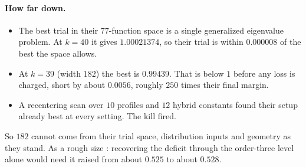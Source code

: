 \paragraph{How far down.} 
\begin{itemize}
\item The best trial in their $77$-function space is a single generalized eigenvalue problem. At $k=40$ it gives $1.00021374$, so their trial is within $0.000008$ of the best the space allows.
\item At $k=39$ (width $182$) the best is $0.99439$. That is below $1$ before any loss is charged, short by about $0.0056$, roughly $250$ times their final margin.
\item A recentering scan over $10$ profiles and $12$ hybrid constants found their setup already best at every setting. The kill fired.
\end{itemize}
So $182$ cannot come from their trial space, distribution inputs and geometry as they stand. As a rough size : recovering the deficit through the order-three level alone would need it raised from about $0.525$ to about $0.528$.

